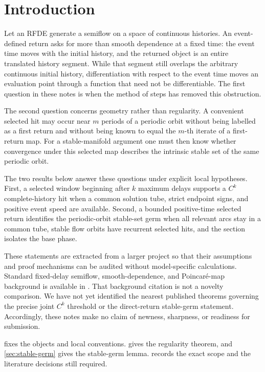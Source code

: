 \section{Introduction}

Let an RFDE generate a semiflow on a space of continuous histories.  An
event-defined return asks for more than smooth dependence at a fixed time:
the event time moves with the initial history, and the returned object is an
entire translated history segment.  While that segment still overlaps the
arbitrary continuous initial history, differentiation with respect to the
event time moves an evaluation point through a function that need not be
differentiable.  The first question in these notes is when the method of
steps has removed this obstruction.

The second question concerns geometry rather than regularity.  A convenient
selected hit may occur near \(m\) periods of a periodic orbit without being
labelled as a first return and without being known to equal the \(m\)-th
iterate of a first-return map.  For a stable-manifold argument one must then
know whether convergence under this selected map describes the intrinsic
stable set of the same periodic orbit.

The two results below answer these questions under explicit local
hypotheses.  First, a selected window beginning after \(k\) maximum delays
supports a \(C^k\) complete-history hit when a common solution tube, strict
endpoint signs, and positive event speed are available.  Second, a bounded
positive-time selected return identifies the periodic-orbit stable-set germ
when all relevant arcs stay in a common tube, stable flow orbits have
recurrent selected hits, and the section isolates the base phase.

These statements are extracted from a larger project so that their
assumptions and proof mechanisms can be audited without model-specific
calculations.  Standard fixed-delay semiflow, smooth-dependence, and
Poincar\'e-map background is available in
\citet{hale1993introduction,diekmann1995delay}.  That background citation is
not a novelty comparison.  We have not yet identified the nearest published
theorems governing the precise joint \(C^k\) threshold or the direct-return
stable-germ statement.  Accordingly, these notes make no claim of newness,
sharpness, or readiness for submission.

 fixes the objects and local conventions.
 gives the regularity theorem, and
\cref{sec:stable-germ} gives the stable-germ lemma.
 records the exact scope and the literature decisions
still required.
